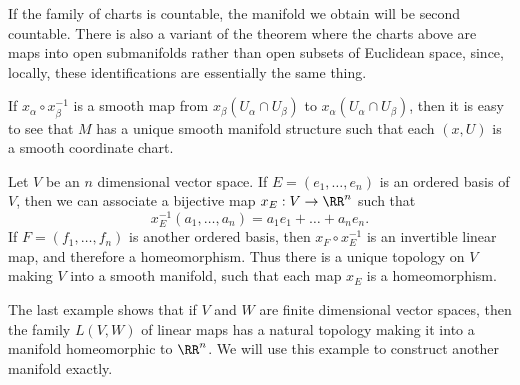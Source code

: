 \begin{remark}
    If the family of charts is countable, the manifold we obtain will be second countable. There is also a variant of the theorem where the charts above are maps into open submanifolds rather than open subsets of Euclidean space, since, locally, these identifications are essentially the same thing.
\end{remark}

\begin{remark}
    If $x_\alpha \circ x_\beta^{-1}$ is a smooth map from $x_\beta(U_\alpha \cap U_\beta)$ to $x_\alpha(U_\alpha \cap U_\beta)$, then it is easy to see that $M$ has a unique smooth manifold structure such that each $(x,U)$ is a smooth coordinate chart.
\end{remark}

\begin{example}
    Let $V$ be an $n$ dimensional vector space. If $E = (e_1, \dots, e_n)$ is an ordered basis of $V$, then we can associate a bijective map $x_E: V \to \RR^n$ such that
    \[ x_E^{-1}(a_1, \dots, a_n) = a_1e_1 + \dots + a_ne_n. \]
    If $F = (f_1, \dots, f_n)$ is another ordered basis, then $x_F \circ x_E^{-1}$ is an invertible linear map, and therefore a homeomorphism. Thus there is a unique topology on $V$ making $V$ into a smooth manifold, such that each map $x_E$ is a homeomorphism.
\end{example}

The last example shows that if $V$ and $W$ are finite dimensional vector spaces, then the family $L(V,W)$ of linear maps has a natural topology making it into a manifold homeomorphic to $\RR^n$. We will use this example to construct another manifold exactly.

